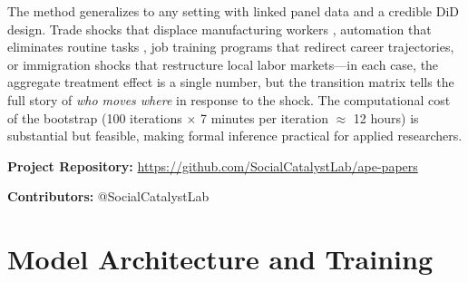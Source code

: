 \documentclass[12pt]{article}
\begin{document}
The method generalizes to any setting with linked panel data and a credible DiD design. Trade shocks that displace manufacturing workers \citep{autor2013}, automation that eliminates routine tasks \citep{autor2003, deming2020}, job training programs that redirect career trajectories, or immigration shocks that restructure local labor markets---in each case, the aggregate treatment effect is a single number, but the transition matrix tells the full story of \textit{who moves where} in response to the shock. The computational cost of the bootstrap (100 iterations $\times$ 7 minutes per iteration $\approx$ 12 hours) is substantial but feasible, making formal inference practical for applied researchers.


\newpage

\noindent\textbf{Project Repository:} \url{https://github.com/SocialCatalystLab/ape-papers}

\noindent\textbf{Contributors:} @SocialCatalystLab

\label{apep_main_text_end}



\newpage
\appendix

\section{Model Architecture and Training}
\label{app:model}
\end{document}
